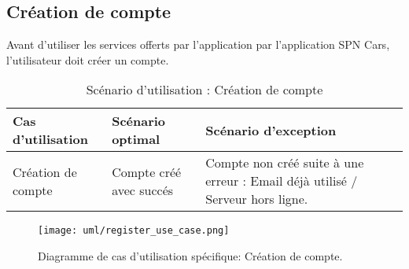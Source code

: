 \subsection{Création de compte}
Avant d'utiliser les services offerts par l'application par l'application SPN Cars, l'utilisateur doit créer un compte.
\begin{table}[H]
    \begin{center}
        \begin{tabularx}{\textwidth} {
                | >{\centering\arraybackslash}X
                | >{\centering\arraybackslash}X
                | >{\centering\arraybackslash}X |}
            \hline
            Cas d'utilisation  & Scénario optimal        & Scénario d'exception                                                          \\
            \hline
            Création de compte & Compte créé avec succés & Compte non créé suite à une erreur : Email déjà utilisé / Serveur hors ligne. \\
            \hline
        \end{tabularx}
        \captionsetup{justification=centering}
        \caption{Scénario d'utilisation : Création de compte}
        \label{tab:register_scenario}
    \end{center}
\end{table}
\vspace{1cm}
\begin{figure}[H]
    \centering
    \texttt{[image: uml/register\_use\_case.png]}
    \captionsetup{justification = centering}
    \caption{Diagramme de cas d'utilisation spécifique: Création de compte.}
    \label{fig:register_use_case}
\end{figure}
